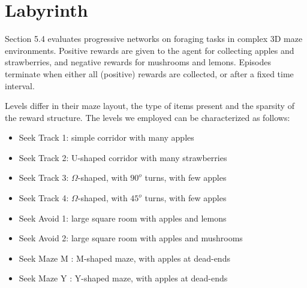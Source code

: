 \section{Labyrinth}

Section 5.4 evaluates progressive networks on foraging tasks in complex 3D maze
environments. Positive rewards are given to the agent for collecting apples and
strawberries, and negative rewards for mushrooms and lemons.
Episodes terminate when either all (positive) rewards are collected, or after a
fixed time interval.

Levels differ in their maze layout, the type of items present and the sparsity
of the reward structure. The levels we employed can be characterized as follows:
\begin{itemize}
\item Seek Track 1: simple corridor with many apples
\item Seek Track 2: U-shaped corridor with many strawberries
\item Seek Track 3: $\Omega$-shaped, with $90^o$ turns, with few apples
\item Seek Track 4: $\Omega$-shaped, with $45^o$ turns, with few apples
\item Seek Avoid 1: large square room with apples and lemons
\item Seek Avoid 2: large square room with apples and mushrooms
\item Seek Maze M : M-shaped maze, with apples at dead-ends
\item Seek Maze Y : Y-shaped maze, with apples at dead-ends
\end{itemize}
